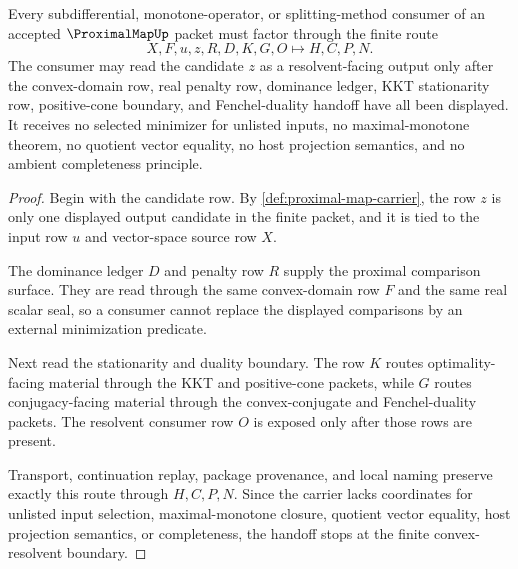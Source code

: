 \begin{theorem}
\label{thm:proximal-map-convex-resolvent-handoff}
Every subdifferential, monotone-operator, or splitting-method consumer of an accepted $\ProximalMapUp$ packet must factor through the finite route
$$
X,F,u,z,R,D,K,G,O \longmapsto H,C,P,N .
$$
The consumer may read the candidate $z$ as a resolvent-facing output only after the convex-domain row, real penalty row, dominance ledger, KKT stationarity row, positive-cone boundary, and Fenchel-duality handoff have all been displayed. It receives no selected minimizer for unlisted inputs, no maximal-monotone theorem, no quotient vector equality, no host projection semantics, and no ambient completeness principle.
\end{theorem}
\begin{proof}
Begin with the candidate row. By \autoref{def:proximal-map-carrier}, the row $z$ is only one displayed output candidate in the finite packet, and it is tied to the input row $u$ and vector-space source row $X$.

The dominance ledger $D$ and penalty row $R$ supply the proximal comparison surface. They are read through the same convex-domain row $F$ and the same real scalar seal, so a consumer cannot replace the displayed comparisons by an external minimization predicate.

Next read the stationarity and duality boundary. The row $K$ routes optimality-facing material through the KKT and positive-cone packets, while $G$ routes conjugacy-facing material through the convex-conjugate and Fenchel-duality packets. The resolvent consumer row $O$ is exposed only after those rows are present.

Transport, continuation replay, package provenance, and local naming preserve exactly this route through $H,C,P,N$. Since the carrier lacks coordinates for unlisted input selection, maximal-monotone closure, quotient vector equality, host projection semantics, or completeness, the handoff stops at the finite convex-resolvent boundary.
\end{proof}


